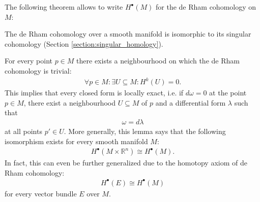     The following theorem allows to write $H^\bullet(M)$ for the de Rham cohomology on $M$:
    \begin{theorem}[de Rham]
        The de Rham cohomology over a smooth manifold is isomorphic to its singular cohomology (Section \ref{section:singular_homology}).
    \end{theorem}

    \begin{theorem}\label{bundle:poincare}
         For every point $p\in M$ there exists a neighbourhood on which the de Rham cohomology is trivial:
        \begin{gather}
            \forall p\in M:\exists U\subseteq M:H^k(U) = 0.
        \end{gather}
        This implies that every closed form is locally exact, i.e. if $d\omega=0$ at the point $p\in M$, there exist a neighbourhood $U\subseteq M$ of $p$ and a differential form $\lambda$ such that
        \begin{gather}
            \omega = d\lambda
        \end{gather}
        at all points $p'\in U$. More generally, this lemma says that the following isomorphism exists for every smooth manifold $M$:
        \begin{gather}
            H^\bullet(M\times\mathbb{R}^n)\cong H^\bullet(M).
        \end{gather}
        In fact, this can even be further generalized due to the homotopy axiom of de Rham cohomology:
        \begin{gather}
            H^\bullet(E)\cong H^\bullet(M)
        \end{gather}
        for every vector bundle $E$ over $M$.
    \end{theorem}


